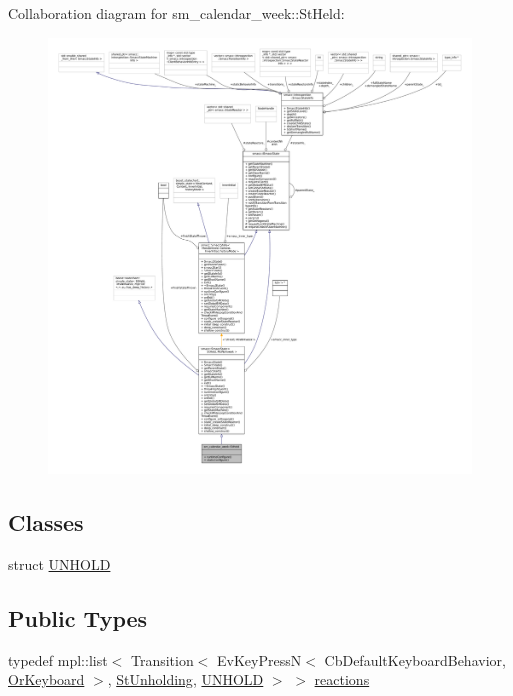 Collaboration diagram for sm\+\_\+calendar\+\_\+week\+:\+:St\+Held\+:
\nopagebreak
\begin{figure}[H]
\begin{center}
\leavevmode
\includegraphics[width=350pt]{structsm__calendar__week_1_1StHeld__coll__graph}
\end{center}
\end{figure}
\subsection*{Classes}
\begin{DoxyCompactItemize}
\item 
struct \hyperlink{structsm__calendar__week_1_1StHeld_1_1UNHOLD}{U\+N\+H\+O\+LD}
\end{DoxyCompactItemize}
\subsection*{Public Types}
\begin{DoxyCompactItemize}
\item 
typedef mpl\+::list$<$ Transition$<$ Ev\+Key\+PressN$<$ Cb\+Default\+Keyboard\+Behavior, \hyperlink{classsm__calendar__week_1_1OrKeyboard}{Or\+Keyboard} $>$, \hyperlink{structsm__calendar__week_1_1StUnholding}{St\+Unholding}, \hyperlink{structsm__calendar__week_1_1StHeld_1_1UNHOLD}{U\+N\+H\+O\+LD} $>$ $>$ \hyperlink{structsm__calendar__week_1_1StHeld_af2d1560fc1136fde91397dfd2abc8ab1}{reactions}
\end{DoxyCompactItemize}
